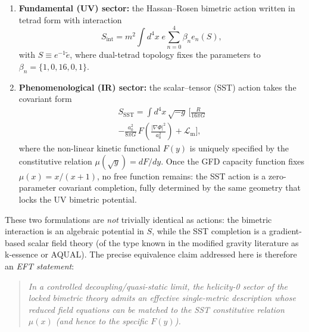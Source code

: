 \documentclass[twocolumn]{iopjournal}
\begin{document}
\begin{enumerate}
\item \textbf{Fundamental (UV) sector:} the Hassan--Rosen bimetric action written in tetrad form with interaction
\begin{equation}
S_{\mathrm{int}} = m^2\!\int\! d^4x\; e \sum_{n=0}^4 \beta_n e_n(S),
\end{equation}
with $S \equiv e^{-1}\tilde e$,
where dual-tetrad topology fixes the parameters to $\beta_n=\{1,0,16,0,1\}$.

\item \textbf{Phenomenological (IR) sector:} the scalar--tensor (SST) action takes the covariant form
\begin{multline}
S_{\mathrm{SST}} = \int\! d^4x\,\sqrt{-g}\,\biggl[\frac{R}{16\pi G} \\
- \frac{a_0^2}{8\pi G}\,F\!\!\left(\frac{|\nabla\Phi|^2}{a_0^2}\right) + \mathcal{L}_{\mathrm{m}}\biggr],
\end{multline}
where the non-linear kinetic functional $F(y)$ is uniquely specified by the constitutive relation $\mu(\sqrt{y}) = dF/dy$. Once the GFD capacity function fixes $\mu(x) = x/(x+1)$, no free function remains: the SST action is a zero-parameter covariant completion, fully determined by the same geometry that locks the UV bimetric potential.
\end{enumerate}



These two formulations are \emph{not} trivially identical as actions: the bimetric interaction is an algebraic potential in $S$, while the SST completion is a gradient-based scalar field theory (of the type known in the modified gravity literature as k-essence or AQUAL). The precise equivalence claim addressed here is therefore an \emph{EFT statement}:

\begin{quote}
\emph{In a controlled decoupling/quasi-static limit, the helicity-0 sector of the locked bimetric theory admits an effective single-metric description whose reduced field equations can be matched to the SST constitutive relation $\mu(x)$ (and hence to the specific $F(y)$).}
\end{quote}
\end{document}
